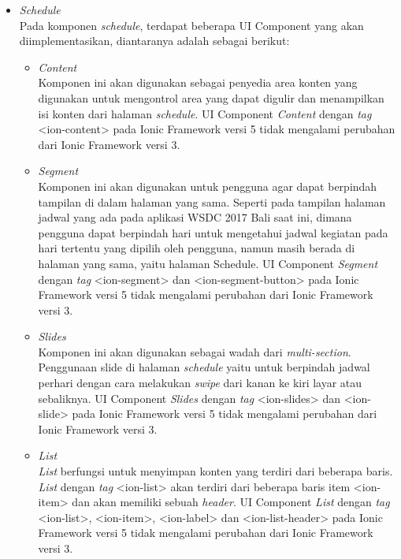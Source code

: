 \begin{itemize}
		
	\item \textit{Schedule} \\
	Pada komponen \textit{schedule}, terdapat beberapa UI Component yang akan diimplementasikan, diantaranya adalah sebagai berikut:
		\begin{itemize}
			\item \textit{Content} \\
		Komponen ini akan digunakan sebagai penyedia area konten yang digunakan untuk mengontrol area yang dapat digulir dan menampilkan isi konten dari halaman \textit{schedule}. UI Component \textit{Content} dengan \textit{tag} <ion-content> pada Ionic Framework versi 5 tidak mengalami perubahan dari Ionic Framework versi 3.
			\item \textit{Segment} \\
		Komponen ini akan digunakan untuk pengguna agar dapat berpindah tampilan di dalam halaman yang sama. Seperti pada tampilan halaman jadwal yang ada pada aplikasi WSDC 2017 Bali saat ini, dimana pengguna dapat berpindah hari untuk mengetahui jadwal kegiatan pada hari tertentu yang dipilih oleh pengguna, namun masih berada di halaman yang sama, yaitu halaman Schedule. UI Component \textit{Segment} dengan \textit{tag} <ion-segment> dan <ion-segment-button> pada Ionic Framework versi 5 tidak mengalami perubahan dari Ionic Framework versi 3.
		
\newpage		
		
			\item \textit{Slides} \\
		Komponen ini akan digunakan sebagai wadah dari \textit{multi-section}. Penggunaan slide di halaman \textit{schedule} yaitu untuk berpindah jadwal perhari dengan cara melakukan \textit{swipe} dari kanan ke kiri layar atau sebaliknya. UI Component \textit{Slides} dengan \textit{tag} <ion-slides> dan <ion-slide> pada Ionic Framework versi 5 tidak mengalami perubahan dari Ionic Framework versi 3.
			\item \textit{List} \\
			\textit{List} berfungsi untuk menyimpan konten yang terdiri dari beberapa baris. \textit{List} dengan \textit{tag} <ion-list> akan terdiri dari beberapa baris item <ion-item> dan akan memiliki sebuah \textit{header}. UI Component \textit{List} dengan \textit{tag} <ion-list>, <ion-item>, <ion-label> dan <ion-list-header> pada Ionic Framework versi 5 tidak mengalami perubahan dari Ionic Framework versi 3.
		\end{itemize}
		

\end{itemize}
